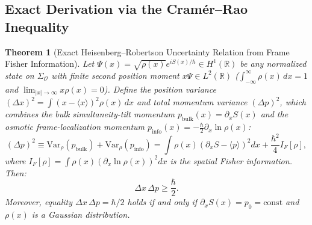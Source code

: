 \documentclass[11pt, a4paper]{article}
\newtheorem{theorem}{Theorem}[section]
\theoremstyle{definition}
\begin{document}
\subsection{Exact Derivation via the Cram\'{e}r--Rao Inequality}
\label{subsec:route_b_cramerrao}

\begin{theorem}[Exact Heisenberg--Robertson Uncertainty Relation from Frame Fisher Information]
\label{thm:uncertainty}
Let $\Psi(x) = \sqrt{\rho(x)}e^{iS(x)/\hbar} \in H^1(\mathbb{R})$ be any normalized state on $\Sigma_{\mathcal{O}}$ with finite second position moment $x\Psi \in L^2(\mathbb{R})$ ($\int_{-\infty}^{\infty}\rho(x)\,dx = 1$ and $\lim_{|x|\to\infty} x\rho(x) = 0$). Define the position variance $(\Delta x)^2 = \int (x - \langle x \rangle)^2 \rho(x)\,dx$ and total momentum variance $(\Delta p)^2$, which combines the bulk simultaneity-tilt momentum $p_{\text{bulk}}(x) = \partial_x S(x)$ and the osmotic frame-localization momentum $p_{\text{info}}(x) = -\frac{\hbar}{2}\partial_x \ln\rho(x)$:
\begin{equation}
\label{eq:p_var_decomp}
(\Delta p)^2 \equiv \text{Var}_\rho(p_{\text{bulk}}) + \text{Var}_\rho(p_{\text{info}}) = \int \rho(x) \left( \partial_x S - \langle p \rangle \right)^2 dx + \frac{\hbar^2}{4} I_F[\rho],
\end{equation}
where $I_F[\rho] = \int \rho(x) (\partial_x \ln\rho(x))^2 dx$ is the spatial Fisher information. Then:
\begin{equation}
\label{eq:heisenberg}
\Delta x \, \Delta p \ge \frac{\hbar}{2}.
\end{equation}
Moreover, equality $\Delta x \, \Delta p = \hbar / 2$ holds if and only if $\partial_x S(x) = p_0 = \text{const}$ and $\rho(x)$ is a Gaussian distribution.
\end{theorem}
\end{document}
